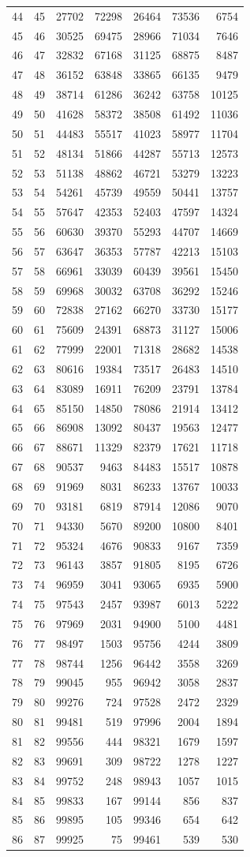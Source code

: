 \documentclass[]{article}
\begin{document}
\begin{longtable}[]{@{}rrrrrrr@{}}
44 & 45 & 27702 & 72298 & 26464 & 73536 & 6754\tabularnewline
45 & 46 & 30525 & 69475 & 28966 & 71034 & 7646\tabularnewline
46 & 47 & 32832 & 67168 & 31125 & 68875 & 8487\tabularnewline
47 & 48 & 36152 & 63848 & 33865 & 66135 & 9479\tabularnewline
48 & 49 & 38714 & 61286 & 36242 & 63758 & 10125\tabularnewline
49 & 50 & 41628 & 58372 & 38508 & 61492 & 11036\tabularnewline
50 & 51 & 44483 & 55517 & 41023 & 58977 & 11704\tabularnewline
51 & 52 & 48134 & 51866 & 44287 & 55713 & 12573\tabularnewline
52 & 53 & 51138 & 48862 & 46721 & 53279 & 13223\tabularnewline
53 & 54 & 54261 & 45739 & 49559 & 50441 & 13757\tabularnewline
54 & 55 & 57647 & 42353 & 52403 & 47597 & 14324\tabularnewline
55 & 56 & 60630 & 39370 & 55293 & 44707 & 14669\tabularnewline
56 & 57 & 63647 & 36353 & 57787 & 42213 & 15103\tabularnewline
57 & 58 & 66961 & 33039 & 60439 & 39561 & 15450\tabularnewline
58 & 59 & 69968 & 30032 & 63708 & 36292 & 15246\tabularnewline
59 & 60 & 72838 & 27162 & 66270 & 33730 & 15177\tabularnewline
60 & 61 & 75609 & 24391 & 68873 & 31127 & 15006\tabularnewline
61 & 62 & 77999 & 22001 & 71318 & 28682 & 14538\tabularnewline
62 & 63 & 80616 & 19384 & 73517 & 26483 & 14510\tabularnewline
63 & 64 & 83089 & 16911 & 76209 & 23791 & 13784\tabularnewline
64 & 65 & 85150 & 14850 & 78086 & 21914 & 13412\tabularnewline
65 & 66 & 86908 & 13092 & 80437 & 19563 & 12477\tabularnewline
66 & 67 & 88671 & 11329 & 82379 & 17621 & 11718\tabularnewline
67 & 68 & 90537 & 9463 & 84483 & 15517 & 10878\tabularnewline
68 & 69 & 91969 & 8031 & 86233 & 13767 & 10033\tabularnewline
69 & 70 & 93181 & 6819 & 87914 & 12086 & 9070\tabularnewline
70 & 71 & 94330 & 5670 & 89200 & 10800 & 8401\tabularnewline
71 & 72 & 95324 & 4676 & 90833 & 9167 & 7359\tabularnewline
72 & 73 & 96143 & 3857 & 91805 & 8195 & 6726\tabularnewline
73 & 74 & 96959 & 3041 & 93065 & 6935 & 5900\tabularnewline
74 & 75 & 97543 & 2457 & 93987 & 6013 & 5222\tabularnewline
75 & 76 & 97969 & 2031 & 94900 & 5100 & 4481\tabularnewline
76 & 77 & 98497 & 1503 & 95756 & 4244 & 3809\tabularnewline
77 & 78 & 98744 & 1256 & 96442 & 3558 & 3269\tabularnewline
78 & 79 & 99045 & 955 & 96942 & 3058 & 2837\tabularnewline
79 & 80 & 99276 & 724 & 97528 & 2472 & 2329\tabularnewline
80 & 81 & 99481 & 519 & 97996 & 2004 & 1894\tabularnewline
81 & 82 & 99556 & 444 & 98321 & 1679 & 1597\tabularnewline
82 & 83 & 99691 & 309 & 98722 & 1278 & 1227\tabularnewline
83 & 84 & 99752 & 248 & 98943 & 1057 & 1015\tabularnewline
84 & 85 & 99833 & 167 & 99144 & 856 & 837\tabularnewline
85 & 86 & 99895 & 105 & 99346 & 654 & 642\tabularnewline
86 & 87 & 99925 & 75 & 99461 & 539 & 530\tabularnewline

\end{longtable}
\end{document}
